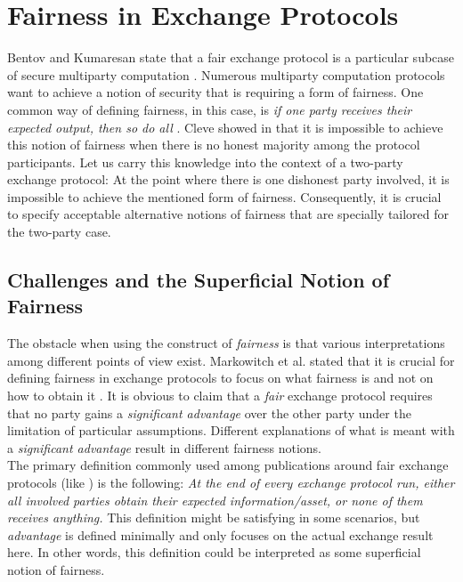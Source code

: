 \documentclass{cacthesis}
\newcounter{protocol}
\begin{document}
    \chapter{Fairness in Exchange Protocols}
        Bentov and Kumaresan state that a fair exchange protocol is a particular subcase of secure multiparty computation \cite{10.1007/978-3-662-44381-1_24}. Numerous multiparty computation protocols want to achieve a notion of security that is requiring a form of fairness. One common way of defining fairness, in this case, is \textit{if one party receives their expected output, then so do all} \cite{10.1007/978-3-540-79263-5_8}. Cleve showed in \cite{10.1145/12130.12168} that it is impossible to achieve this notion of fairness when there is no honest majority among the protocol participants. Let us carry this knowledge into the context of a two-party exchange protocol: At the point where there is one dishonest party involved, it is impossible to achieve the mentioned form of fairness. Consequently, it is crucial to specify acceptable alternative notions of fairness that are specially tailored for the two-party case. 
        
        \section{Challenges and the Superficial Notion of Fairness}
		The obstacle when using the construct of \textit{fairness} is that various interpretations among different points of view exist. Markowitch et al. stated that it is crucial for defining fairness in exchange protocols to focus on what fairness is and not on how to obtain it \cite{10.1007/3-540-36552-4_31}. It is obvious to claim that a \textit{fair} exchange protocol requires that no party gains a \textit{significant advantage} over the other party under the limitation of particular assumptions. Different explanations of what is meant with a \textit{significant advantage} result in different fairness notions. \\
        The primary definition commonly used among publications around fair exchange protocols (like \cite{10.1145/266420.266426} \cite{asyncOptiFairEx1998} \cite{remarksOnFairEx2000})  is the following: \textit{At the end of every exchange protocol run, either all involved parties obtain their expected information/asset, or none of them receives anything.} This definition might be satisfying in some scenarios, but \textit{advantage} is defined minimally and only focuses on the actual exchange result here. In other words, this definition could be interpreted as some superficial notion of fairness.
        
\end{document}
